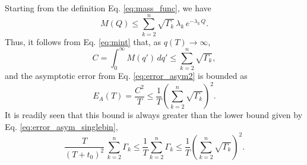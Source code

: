 \documentclass[reprint, superscriptaddress, floatfix]{revtex4-1}
\newcommand{\Err}{E}
\begin{document}
Starting from the definition Eq. \eqref{eq:mass_func}, we have
$$
  M(Q)
  \le
  \sum_{k = 2}^n
  \sqrt{ \Gamma_k } \, \lambda_k \, e^{ -\lambda_k \, Q }
  .
$$
Thus,
it follows from Eq. \eqref{eq:mint} that, as $q(T) \to \infty$,
%
\begin{equation}
  C
  =
  \int_0^\infty
  M(q') \, dq'
  \le
  \sum_{k = 2}^n \sqrt{ \Gamma_k }
  ,
  \label{eq:mint_ubound}
\end{equation}
%
and the asymptotic error from Eq. \eqref{eq:error_asym2}
is bounded as
\begin{equation}
  \Err_A(T)
  =
  \frac{ C^2 } { T }
  \le
  \frac 1 T
  \left(
    \sum_{k=2}^n \sqrt{ \Gamma_k }
  \right)^2
  .
  \label{eq:error_asym_ubound}
\end{equation}
%
It is readily seen that this bound is always
greater than the lower bound given by Eq. \eqref{eq:error_asym_singlebin},
%
$$
\frac{T}{(T+t_0)^2} \, \sum_{k=2}^n \Gamma_k
\le
\frac{1}{T} \sum_{k=2}^n \Gamma_k
\le
\frac{1}{T} \left( \sum_{k=2}^n \sqrt{ \Gamma_k } \right)^2
.
$$
\end{document}
